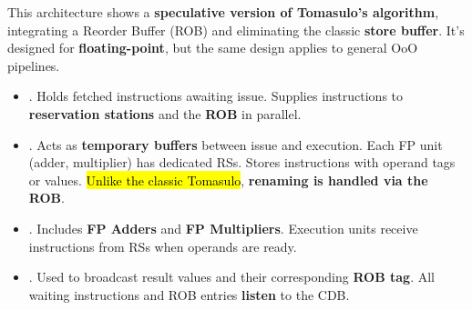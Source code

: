 \noindent
This architecture shows a \textbf{speculative version of Tomasulo's algorithm}, integrating a Reorder Buffer (ROB) and eliminating the classic \textbf{store buffer}. It's designed for \textbf{floating-point}, but the same design applies to general OoO pipelines.
\begin{itemize}
    \item {}. Holds fetched instructions awaiting issue. Supplies instructions to \textbf{reservation stations} and the \textbf{ROB} in parallel.
    
    \item {}. Acts as \textbf{temporary buffers} between issue and execution. Each FP unit (adder, multiplier) has dedicated RSs. Stores instructions with operand tags or values. \hl{Unlike the classic Tomasulo}, \textbf{renaming is handled via the ROB}.

    \item {}. Includes \textbf{FP Adders} and \textbf{FP Multipliers}. Execution units receive instructions from RSs when operands are ready.
    
    \item {}. Used to broadcast result values and their corresponding \textbf{ROB tag}. All waiting instructions and ROB entries \textbf{listen} to the CDB.
    

\end{itemize}
